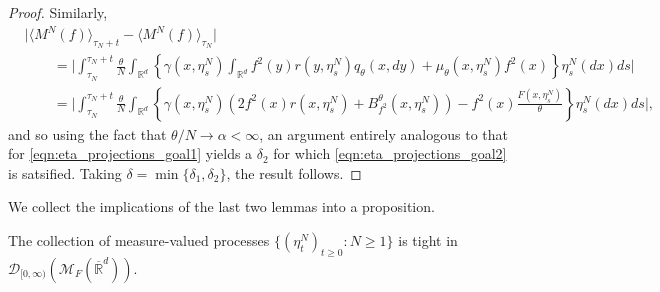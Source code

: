 \documentclass[EJP]{ejpecp} %
\newcommand{\IR}{\mathbb R}
\newcommand{\cmeasures}{\mathcal{M}_F(\overline{\IR}^d)} %
\begin{document}
\begin{proof}
Similarly,
\begin{align*}
    &
 \big|   \langle M^{N}(f) \rangle_{\tau_N + t} 
        - \langle M^{N}(f) \rangle_{\tau_N} \big|
    \\ & \qquad =
  \Big|  \int_{\tau_N}^{\tau_N + t}
        \frac{\theta}{N}
        \int_{\IR^d}
        \left\{
            \gamma(x, \eta^N_s)
            \int_{\IR^d} f^2(y) r(y, \eta^N_s) q_\theta(x, dy)
            +
            \mu_\theta(x, \eta^N_s) f^2(x)
        \right\}
        \eta^N_s(dx)
    ds \Big|
    \\ & \qquad =
   \Big| \int_{\tau_N}^{\tau_N + t}
        \frac{\theta}{N}
        \int_{\IR^d}
        \left\{
            \gamma(x, \eta^N_s)
            \left(
                2 f^2(x) r(x, \eta^N_s)
                +
                B^\theta_{f^2}(x, \eta^N_s)
            \right)
            -
            f^2(x) \frac{F(x, \eta^N_s)}{ \theta}
        \right\}
        \eta^N_s(dx)
    ds\Big| ,
\end{align*}
and so using the fact that $\theta/N \to \alpha < \infty$,
an argument entirely analogous to 
that for \eqref{eqn:eta_projections_goal1}
yields a $\delta_2$ for which \eqref{eqn:eta_projections_goal2} is
satsified. Taking $\delta=\min\{\delta_1,\delta_2\}$, the result follows.

\end{proof}


We collect the implications of the last two lemmas into a proposition.

\begin{proposition}
\label{tightness in one point compactification}
    The collection of measure-valued processes 
    $\{(\eta^{N}_t)_{t \geq 0}: N \geq 1\}$
    is tight in $\mathcal{D}_{[0,\infty)}(\cmeasures)$.
\end{proposition}
\end{document}
